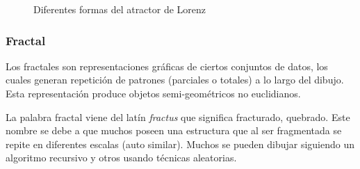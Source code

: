 \documentclass[letterpaper, 11pt, oneside]{article}
\theoremstyle{definition}
\theoremstyle{remark}
\begin{document}
\begin{itemize}
\begin{figure}[h!]
	\centering
	\hspace{0cm}
	\caption{Diferentes formas del atractor de Lorenz}
	\label{lorenz}
\end{figure}

\newpage
\subsubsection{Fractal}
Los fractales son representaciones gráficas de ciertos conjuntos de datos, los cuales generan repetición de patrones (parciales o totales) a lo largo del dibujo. Esta representación produce  objetos semi-geométricos no euclidianos.

La palabra fractal viene del latín \textit{fractus} que significa fracturado, quebrado. Este nombre se debe a que muchos poseen una estructura que al ser fragmentada se repite en diferentes escalas (auto similar). Muchos se pueden dibujar siguiendo un algoritmo recursivo y otros usando técnicas aleatorias.


\end{itemize}
\end{document}
